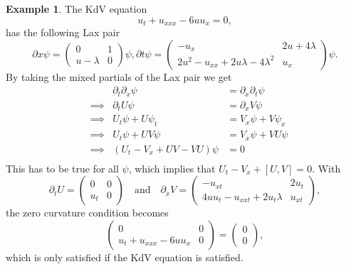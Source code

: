 \documentclass[english,master]{liumaiex}
\theoremstyle{plain}
\theoremstyle{definition}
\newtheorem{example}[proposition]{Example}
\begin{document}
\begin{example}
The KdV equation
\begin{equation}
	u_t + u_{xxx} - 6uu_x = 0,
\end{equation}
has the following Lax pair
\begin{subequations}
  \begin{equation}
    \partial x \psi =
    \begin{pmatrix}
      0 & 1 \\
      u - \lambda & 0
    \end{pmatrix}
	\psi,
  \end{equation}
  \begin{equation}
    \partial t \psi =
    \begin{pmatrix}
      -u_x & 2u + 4\lambda \\
      2u^2 - u_{xx} + 2u\lambda - 4\lambda^2 & u_x
    \end{pmatrix}
    \psi.
  \end{equation}
\end{subequations}
By taking the mixed partials of the Lax pair we get
\begin{equation}
\begin{aligned}
	& & \partial_t \partial_x \psi &= \partial_x \partial_t \psi \\
	& \implies & \partial_t U \psi &= \partial_x V \psi \\  
	& \implies & U_t \psi + U \psi_t &= V_x \psi + V \psi_x \\
	& \implies & U_t \psi + U V \psi &= V_x \psi + V U \psi \\
	& \implies & (U_t - V_x + U V - V U) \psi &= 0 \\
\end{aligned}
\end{equation}
This has to be true for all $\psi$, which implies that $U_t - V_x + [U, V] = 0$. With
\begin{equation}
\partial_t U =
\begin{pmatrix}
	0 & 0 \\
	u_t & 0
\end{pmatrix}
\quad \text{and} \quad
\partial_x V =
\begin{pmatrix}
	-u_{xt} & 2u_t \\
	4uu_t - u_{xxt} + 2u_t\lambda & u_{xt}
\end{pmatrix},
\end{equation}
the zero curvature condition becomes
\begin{equation}
	\begin{pmatrix}
	0 & 0\\
	u_t + u_{xxx} - 6u u_x & 0
	\end{pmatrix} =
	\begin{pmatrix} 0 \\ 0 \end{pmatrix},
\end{equation}
which is only satisfied if the KdV equation is satisfied.
\end{example}
\end{document}
